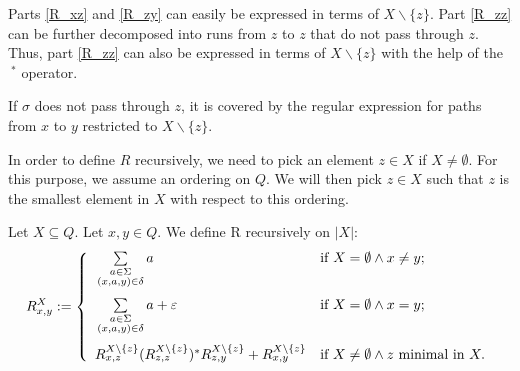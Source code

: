 Parts \ref{R_xz} and \ref{R_zy} can easily be expressed in terms of $X\backslash\{z\}$.
Part \ref{R_zz} can be further decomposed into runs from $z$ to $z$ that do not pass through $z$.
Thus, part \ref{R_zz} can also be expressed in terms of $X\backslash\{z\}$ with the help of the $\ ^*$ operator.

If $\sigma$ does not pass through $z$, it is covered by the regular expression for paths from $x$ to $y$ restricted to $X\backslash\{z\}$.

In order to define $R$ recursively, we need to pick an element $z \in X$ if $X \neq \emptyset$. 
For this purpose, we assume an ordering on $Q$.
We will then pick $z \in X$ such that $z$ is the smallest element in $X$ with respect to this ordering. 

\begin{definition}
    \label{R}
    Let $X \subseteq Q$. Let $x, y \in Q$.
    We define R recursively on $|X|$:
    \begin{equation*}
        R^X_{x,y} := \left\{  
                \begin{array}{ll}
                    \vphantom{ \sum\limits_{ \substack{ a \in \Sigma\\ (x,a,y) \in \delta \\ b \in \Sigma } } }
                    \sum\limits_{
                        \substack{
                            a \in \Sigma\\
                            (x,a,y) \in \delta
                        }
                    } a 
                    & \mbox{if } X = \emptyset \wedge x \neq y; \\
                    \vphantom{ \sum\limits_{ \substack{ a \in \Sigma\\ (x,a,y) \in \delta \\ b \in \Sigma } } }
                    \sum\limits_{
                        \substack{
                            a \in \Sigma\\
                            (x,a,y) \in \delta
                        }
                    } a + \varepsilon 
                    & \mbox{if } X = \emptyset \wedge x = y; \\
                     R^{X\backslash\{z\}}_{x,z} (R^{X\backslash\{z\}}_{z,z})^* R^{X\backslash\{z\}}_{z,y} + R^{X\backslash\{z\}}_{x,y}
                     & \mbox{if } X \neq \emptyset \wedge z \mbox{ minimal in } X.
                \end{array}
            \right.
    \end{equation*}
\end{definition}

